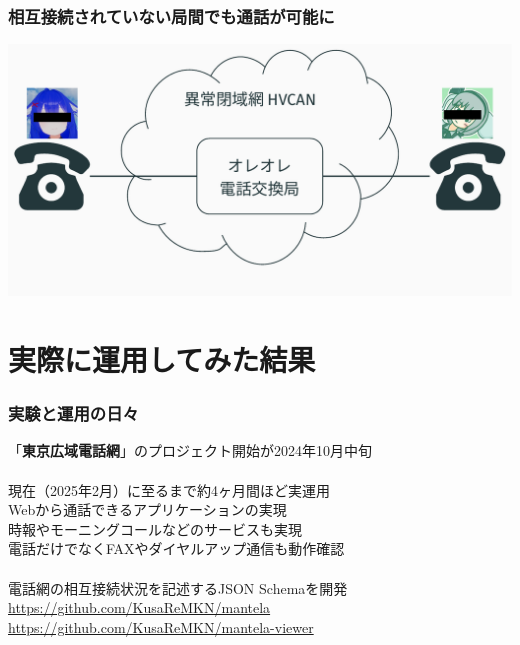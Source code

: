 \documentclass[
  lualatex,
  aspectratio=169,
  14pt
]{beamer}
\begin{document}
\begin{frame}
  \frametitle{相互接続されていない局間でも通話が可能に}

  \includegraphics[page=7,width=\linewidth]{./images/pictures.pdf}
\end{frame}

\section{実際に運用してみた結果}

\begin{frame}
  \frametitle{実験と運用の日々}

  「\textbf{東京広域電話網}」のプロジェクト開始が2024年10月中旬
  \\~\\[-.5\baselineskip]

  現在（2025年2月）に至るまで約4ヶ月間ほど実運用\\
  \hspace{1.5\zw}Webから通話できるアプリケーションの実現\\
  \hspace{1.5\zw}時報やモーニングコールなどのサービスも実現\\
  \hspace{1.5\zw}電話だけでなくFAXやダイヤルアップ通信も動作確認
  \\~\\[-.5\baselineskip]

  電話網の相互接続状況を記述するJSON Schemaを開発\\
  \hspace{1.5\zw}\url{https://github.com/KusaReMKN/mantela}\\
  \hspace{1.5\zw}\url{https://github.com/KusaReMKN/mantela-viewer}
\end{frame}
\end{document}
